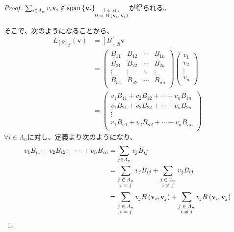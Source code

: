 \documentclass[dvipdfmx]{jsarticle}
\begin{document}
\begin{proof}
$\sum_{i \in \varLambda_{n}} {v_{i}\mathbf{v}_{i}} \notin {\mathrm{span}}\left\{ \mathbf{v}_{i} \right\}_{\scriptsize \begin{matrix} i \in \varLambda_{n} \\0 = B\left( \mathbf{v}_{i},\mathbf{v}_{i} \right) \end{matrix}}$が得られる。\par
そこで、次のようになることから、
\begin{align*}
L_{[ B]_{\mathcal{B}}}\left( \mathbf{v} \right) &= [ B]_{\mathcal{B}}\mathbf{v} \\
&= \begin{pmatrix}
B_{11} & B_{12} & \cdots & B_{1n} \\
B_{21} & B_{22} & \cdots & B_{2n} \\
 \vdots & \vdots & \ddots & \vdots \\
B_{n1} & B_{n2} & \cdots & B_{nn} \\
\end{pmatrix}\begin{pmatrix}
v_{1} \\
v_{2} \\
 \vdots \\
v_{n} \\
\end{pmatrix}\\
&= \begin{pmatrix}
v_{1}B_{11} + v_{2}B_{12} + \cdots + v_{n}B_{1n} \\
v_{1}B_{21} + v_{2}B_{22} + \cdots + v_{n}B_{2n} \\
 \vdots \\
v_{1}B_{n1} + v_{2}B_{n2} + \cdots + v_{n}B_{nn} \\
\end{pmatrix}
\end{align*}
$\forall i \in \varLambda_{n}$に対し、定義より次のようになり、
\begin{align*}
v_{1}B_{i1} + v_{2}B_{i2} + \cdots + v_{n}B_{in} &= \sum_{j \in \varLambda_{n}} {v_{j}B_{ij}}\\
&= \sum_{\scriptsize \begin{matrix} j \in \varLambda_{n} \\i = j \end{matrix}} {v_{j}B_{ij}} + \sum_{\scriptsize \begin{matrix} j \in \varLambda_{n} \\i \neq j \end{matrix}} {v_{j}B_{ij}}\\
&= \sum_{\scriptsize \begin{matrix} j \in \varLambda_{n} \\i = j \end{matrix}} {v_{j}B\left( \mathbf{v}_{i},\mathbf{v}_{j} \right)} + \sum_{\scriptsize \begin{matrix} j \in \varLambda_{n} \\i \neq j \end{matrix}} {v_{j}B\left( \mathbf{v}_{i},\mathbf{v}_{j} \right)}

\end{align*}
\end{proof}
\end{document}

